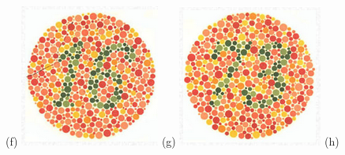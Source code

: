 \documentclass[	12pt, Times, openright, twoside, a4paper, english, brazil]{abntex2}
\begin{document}
\begin{apendicesenv}
\begin{figure}[!htb]
(f)
\endminipage\hfill
{}
\centering
{\includegraphics[width=\linewidth]{ishihara-fuga/figureIshihara16.png}}
(g)
\endminipage\hfill
{}
\centering
{\includegraphics[width=\linewidth]{ishihara-fuga/figureIshihara17.png}}
(h)
\endminipage\hfill


\end{figure}
\end{apendicesenv}
\end{document}
